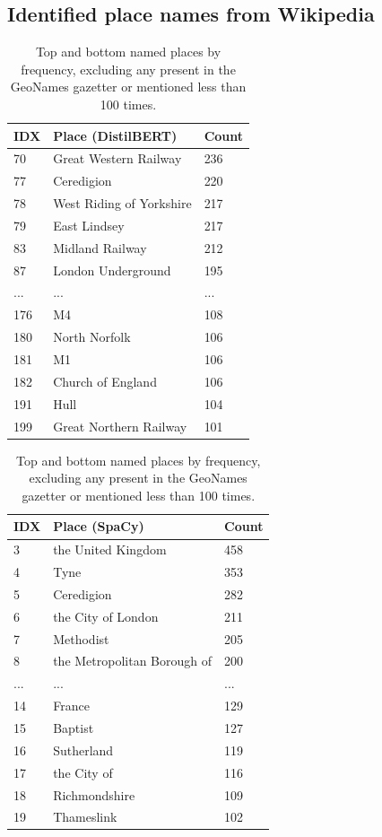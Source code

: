 \documentclass[
  letterpaper,
  11pt,
  english,
  onehalfspacing,
  headsepline]{MastersDoctoralThesis}
\begin{document}
\hypertarget{identified-place-names-from-wikipedia}{%
\subsection{Identified place names from
Wikipedia}\label{identified-place-names-from-wikipedia}}

\begin{table}
\caption{\label{tbl-freq}Top and bottom named places by frequency, excluding any present in the GeoNames gazetter or mentioned less than 100 times.}

\centering
\fontsize{9}{11}\selectfont
\begin{tabular}[t]{lll}
\toprule
\bfseries IDX & \bfseries Place (DistilBERT) & \bfseries Count\\
\midrule
70 & Great Western Railway & 236\\
77 & Ceredigion & 220\\
78 & West Riding of Yorkshire & 217\\
79 & East Lindsey & 217\\
83 & Midland Railway & 212\\
87 & London Underground & 195\\
... & ... & ...\\
176 & M4 & 108\\
180 & North Norfolk & 106\\
181 & M1 & 106\\
182 & Church of England & 106\\
191 & Hull & 104\\
199 & Great Northern Railway & 101\\
\bottomrule
\end{tabular}
\centering
\begin{tabular}[t]{lll}
\toprule
\bfseries IDX & \bfseries Place (SpaCy) & \bfseries Count\\
\midrule
3 & the United Kingdom & 458\\
4 & Tyne & 353\\
5 & Ceredigion & 282\\
6 & the City of London & 211\\
7 & Methodist & 205\\
8 & the Metropolitan Borough of & 200\\
... & ... & ...\\
14 & France & 129\\
15 & Baptist & 127\\
16 & Sutherland & 119\\
17 & the City of & 116\\
18 & Richmondshire & 109\\
19 & Thameslink & 102\\
\bottomrule
\end{tabular}
\end{table}
\end{document}
